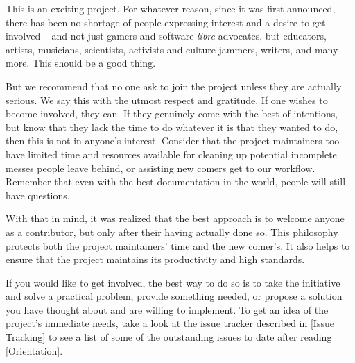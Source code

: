 This is an exciting project. For whatever reason, since it was first announced, there has been no shortage of people expressing interest and a desire to get involved -- and not just gamers and software {\it libre} advocates, but educators, artists, musicians, scientists, activists and culture jammers, writers, and many more. This should be a good thing. 

But we recommend that no one ask to join the project unless they are actually serious. We say this with the utmost respect and gratitude. If one wishes to become involved, they can. If they genuinely come with the best of intentions, but know that they lack the time to do whatever it is that they wanted to do, then this is not in anyone's interest. Consider that the project maintainers too have limited time and resources available for cleaning up potential incomplete messes people leave behind, or assisting new comers get  to our workflow. Remember that even with the best documentation in the world, people will still have questions.

With that in mind, it was realized that the best approach is to welcome anyone as a contributor, but only after their having actually done so. This philosophy protects both the project maintainers' time and the new comer's. It also helps to ensure that the project maintains its productivity and high standards.

If you would like to get involved, the best way to do so is to take the initiative and solve a practical problem, provide something needed, or propose a solution you have thought about and are willing to implement. To get an idea of the project's immediate needs, take a look at the issue tracker described in [Issue Tracking] to see a list of some of the outstanding issues to date after reading [Orientation].

